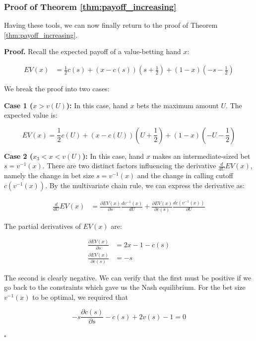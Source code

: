 \documentclass[a4paper,12pt]{article}
\theoremstyle{plain}
\theoremstyle{definition}
\newenvironment{customproof}[1][Proof]{\noindent\textbf{#1.} }{\hfill$\square$\vspace{1em}}
\begin{document}
\subsubsection{Proof of Theorem \ref{thm:payoff_increasing}}

Having these tools, we can now finally return to the proof of Theorem \ref{thm:payoff_increasing}.

\begin{customproof}
    Recall the expected payoff of a value-betting hand $x$:

    \begin{align*}
        EV(x) & = \frac{1}{2} c(s) + (x - c(s)) \left(s+\frac{1}{2}\right) + (1-x) \left(-s-\frac{1}{2}\right)
    \end{align*}

    We break the proof into two cases:

    \textbf{Case 1 ($x > v(U)$):} In this case, hand $x$ bets the maximum amount $U$. The expected value is:
    
    $$ EV(x) = \frac{1}{2} c(U) + (x - c(U)) \left(U+\frac{1}{2}\right) + (1-x) \left(-U-\frac{1}{2}\right) $$ 

    \textbf{Case 2 ($x_3 < x < v(U)$):} In this case, hand $x$ makes an intermediate-sized bet $s = v^{-1}(x)$. There are two distinct factors influencing the derivative $\frac{d}{dU} EV(x)$, namely the change in bet size $s = v^{-1}(x)$ and the change in calling cutoff $c(v^{-1}(x))$. By the multivariate chain rule, we can express the derivative as:

    \begin{align*}
        \frac{d}{dU} EV(x) & = \frac{\partial EV(x)}{\partial s} \frac{d v^{-1}(x)}{d U} + \frac{\partial EV(x)}{\partial c(s)} \frac{d c(v^{-1}(x))}{\partial U}
    \end{align*}

    The partial derivatives of $EV(x)$ are:

    \begin{align*}
        \frac{\partial EV(x)}{\partial s} & = 2x - 1 - c(s) \\
        \frac{\partial EV(x)}{\partial c(s)} & = - s
    \end{align*}

    The second is clearly negative. We can verify that the first must be positive if we go back to the constraints which gave us the Nash equilibrium. For the bet size $v^{-1}(x)$ to be optimal, we required that 

    $$ -s \frac{\partial c(s)}{\partial s} - c(s) + 2v(s) - 1 = 0$$


\end{customproof}
\end{document}
